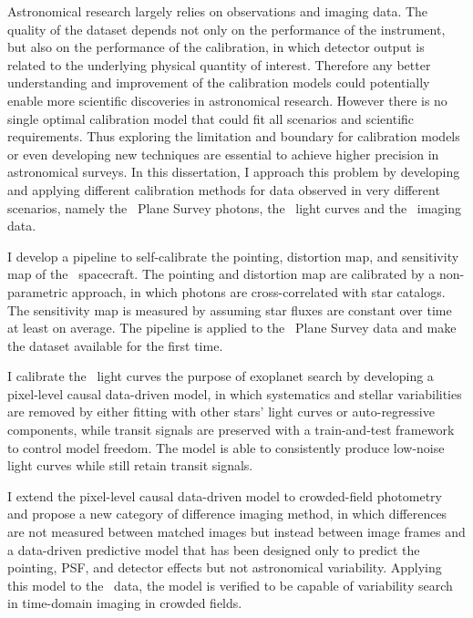 Astronomical research largely relies on observations and imaging data.
The quality of the dataset depends not only on the performance of the instrument, but also on the performance of the calibration, in which detector output is related to the underlying physical quantity of interest.
Therefore any better understanding and improvement of the calibration models could potentially enable more scientific discoveries in astronomical research.
However there is no single optimal calibration model that could fit all scenarios and scientific requirements.
Thus exploring the limitation and boundary for calibration models or even developing new techniques are essential to achieve higher precision in astronomical surveys.
In this dissertation, I approach this problem by developing and applying different calibration methods for data observed in very different scenarios, namely the \galex\ Plane Survey photons, the \kepler\ light curves and the \KTCN\ imaging data.

I develop a pipeline to self-calibrate the pointing, distortion map, and sensitivity map of the \galex\ spacecraft.
The pointing and distortion map are calibrated by a non-parametric approach, in which photons are cross-correlated with star catalogs. 
The sensitivity map is measured by assuming star fluxes are constant over time at least on average.
The pipeline is applied to the \galex\ Plane Survey data and make the dataset available for the first time.

I calibrate the \kepler\ light curves the purpose of exoplanet search by developing a pixel-level causal data-driven model, in which systematics and stellar variabilities are removed by either fitting with other stars' light curves or auto-regressive components, while transit signals are preserved with a train-and-test framework to control model freedom.
The model is able to consistently produce low-noise light curves while still retain transit signals.

I extend the pixel-level causal data-driven model to crowded-field photometry and propose a new category of difference imaging method, in which differences are not measured between matched images but instead between image frames and a data-driven predictive model that has been designed only to predict the pointing, PSF, and detector effects but not astronomical variability.
Applying this model to the \KTCN\ data, the model is verified to be capable of variability search in time-domain imaging in crowded fields.
